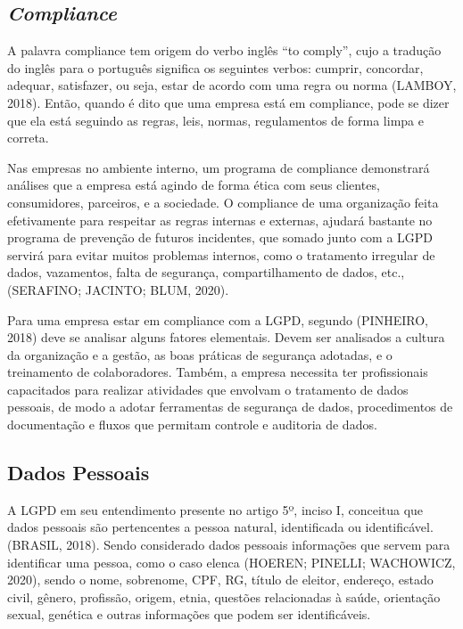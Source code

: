 \documentclass[
	12pt,				%
	openright,			%
	oneside,			%
	a4paper,			%
	english,			%
	french,				%
	spanish,			%
	brazil,				%
	]{abntex2}
\begin{document}
\subsection{\textit{Compliance}}

A palavra compliance tem origem do verbo inglês “to comply”, cujo a tradução do inglês para o português significa os seguintes verbos: cumprir, concordar, adequar, satisfazer, ou seja, estar de acordo com uma regra ou norma (LAMBOY, 2018). Então, quando é dito que uma empresa está em compliance, pode se dizer que ela está seguindo as regras, leis, normas, regulamentos de forma limpa e correta.

Nas empresas no ambiente interno, um programa de compliance demonstrará análises que a empresa está agindo de forma ética com seus clientes, consumidores, parceiros, e a sociedade. O compliance de uma organização feita efetivamente para respeitar as regras internas e externas, ajudará bastante no programa de prevenção de futuros incidentes, que somado junto com a LGPD servirá para evitar muitos problemas internos, como o tratamento irregular de dados, vazamentos, falta de segurança, compartilhamento de dados, etc., (SERAFINO; JACINTO; BLUM, 2020).

Para uma empresa estar em compliance com a LGPD, segundo (PINHEIRO, 2018) deve se analisar alguns fatores elementais. Devem ser analisados a cultura da organização e a gestão, as boas práticas de segurança adotadas, e o treinamento de colaboradores. Também, a empresa necessita ter profissionais capacitados para realizar atividades que envolvam o tratamento de dados pessoais, de modo a adotar ferramentas de segurança de dados, procedimentos de documentação e fluxos que permitam controle e auditoria de dados. 

\subsection{Dados Pessoais}

A LGPD em seu entendimento presente no artigo 5º, inciso I, conceitua que dados pessoais são pertencentes a pessoa natural, identificada ou identificável. (BRASIL, 2018).  Sendo considerado dados pessoais informações que servem para identificar uma pessoa, como o caso elenca (HOEREN; PINELLI; WACHOWICZ, 2020), sendo o nome, sobrenome, CPF, RG, título de eleitor, endereço, estado civil, gênero, profissão, origem, etnia, questões relacionadas à saúde, orientação sexual, genética e outras informações que podem ser identificáveis.
\end{document}
